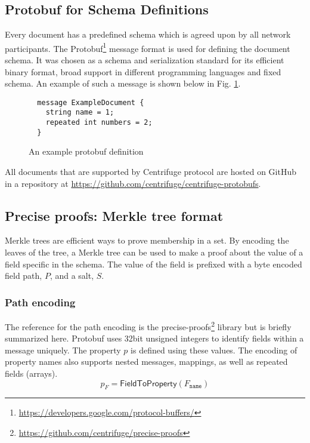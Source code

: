 \subsection{Protobuf for Schema Definitions}\label{sec:protobuf_schema}
Every document has a predefined schema which is agreed upon by all network participants. The Protobuf\footnote{\url{https://developers.google.com/protocol-buffers/}} message format is used for defining the document schema. It was chosen as a schema and serialization standard for its efficient binary format, broad support in different programming languages and fixed schema. An example of such a message is shown below in Fig. \ref{fig:example_document}. 

\begin{figure}[ht]
  \caption{An example protobuf definition}
  \label{fig:example_document}
  \begin{lstlisting}
  message ExampleDocument {
    string name = 1;
    repeated int numbers = 2;
  }\end{lstlisting}
\end{figure}

All documents that are supported by Centrifuge protocol are hosted on GitHub in a repository at \url{https://github.com/centrifuge/centrifuge-protobufs}.  



\subsection{Precise proofs: Merkle tree format}\label{sec:precise_proofs}
Merkle trees are efficient ways to prove membership in a set. By encoding the leaves of the tree, a Merkle tree can be used to make a proof about the value of a field specific in the schema. The value of the field is prefixed with a byte encoded field path, $P$, and a salt, $S$. 


\subsubsection{Path encoding}
The reference for the path encoding is the precise-proofs\footnote{\url{https://github.com/centrifuge/precise-proofs}} library but is briefly summarized here. Protobuf uses 32bit unsigned integers to identify fields within a message uniquely. The property $p$ is defined using these values. The encoding of property names also supports nested messages, mappings, as well as repeated fields (arrays). 
\begin{equation}
    p_{F} = \mathsf{FieldToProperty}(F_{\texttt{name}})
\end{equation}


